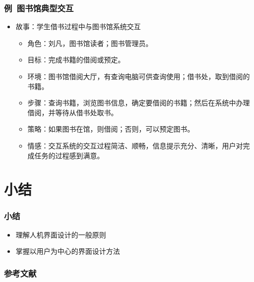 \documentclass{beamer}
\begin{document}
\begin{frame}
	\frametitle{例~{\small 图书馆典型交互}}
	\begin{itemize}
		\item 故事：学生借书过程中与图书馆系统交互
		\begin{itemize}
			\item 角色：刘凡，图书馆读者；图书管理员。
			\item 目标：完成书籍的借阅或预定。
			\item 环境：图书馆借阅大厅，有查询电脑可供查询使用；借书处，取到借阅的书籍。
			\item 步骤：查询书籍，浏览图书信息，确定要借阅的书籍；然后在系统中办理借阅，并等待从借书处取书。
			\item 策略：如果图书在馆，则借阅；否则，可以预定图书。
			\item 情感：交互系统的交互过程简洁、顺畅，信息提示充分、清晰，用户对完成任务的过程感到满意。
		\end{itemize}
	\end{itemize}
\end{frame}

%

\section{小结}
\begin{frame}
	\frametitle{小结}
	\begin{itemize}
		\item 理解人机界面设计的一般原则
		\item 掌握以用户为中心的界面设计方法
	\end{itemize}
\end{frame}

\begin{frame}
	\frametitle{参考文献}
	
	
\end{frame}
\end{document}
